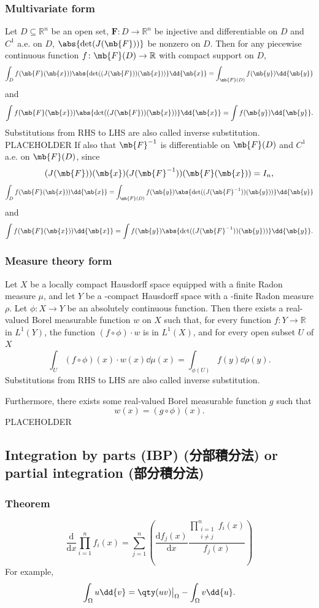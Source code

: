 \subsubsection{Multivariate form}
Let $D\subseteq\mathbb{R}^n$ be an open set, $\mathbf{F}\colon D\to\mathbb{R}^n$ be injective and differentiable on $D$ and $C^1$ a.e. on $D$, $\abs{\det(J(\mb{F}))}$ be nonzero on $D$. Then for any piecewise continuous function $f\colon\mb{F}(D)\to\mathbb{R}$ with compact support on $D$,
\[\int_Df(\mb{F}(\mb{x}))\abs{\det((J(\mb{F}))(\mb{x}))}\dd{\mb{x}}=\int_{\mb{F}(D)}f(\mb{y})\dd{\mb{y}}\]
and
\[\int f(\mb{F}(\mb{x}))\abs{\det((J(\mb{F}))(\mb{x}))}\dd{\mb{x}}=\int f(\mb{y})\dd{\mb{y}}.\]
Substitutions from RHS to LHS are also called inverse substitution.
\bpr
PLACEHOLDER
\epr
If also that $\mb{F}^{-1}$ is differentiable on $\mb{F}(D)$ and $C^1$ a.e. on $\mb{F}(D)$, since
\[(J(\mb{F}))(\mb{x})(J(\mb{F}^{-1}))(\mb{F}(\mb{x}))=I_n,\]
\[\int_Df(\mb{F}(\mb{x}))\dd{\mb{x}}=\int_{\mb{F}(D)}f(\mb{y})\abs{\det((J(\mb{F}^{-1}))(\mb{y}))}\dd{\mb{y}}\]
and
\[\int f(\mb{F}(\mb{x}))\dd{\mb{x}}=\int f(\mb{y})\abs{\det((J(\mb{F}^{-1}))(\mb{y}))}\dd{\mb{y}}.\]
\subsubsection{Measure theory form}
Let $X$ be a locally compact Hausdorff space equipped with a finite Radon measure $μ$, and let $Y$ be a \text{\textsigma}-compact Hausdorff space with a \text{\textsigma}-finite Radon measure $\rho$. Let $\phi\colon X\to Y$ be an absolutely continuous function. Then there exists a real-valued Borel measurable function $w$ on $X$ such that, for every function $f\colon Y\to\mathbb{R}$ in $L^1(Y)$, the function $(f\circ\phi)\cdot w$ is in $L^1(X)$, and for every open subset $U$ of $X$
\[\int_U(f\circ\phi)(x)\cdot w(x)\dd{\mu(x)}=\int_{\phi(U)}f(y)\dd{\rho(y)}.\]
Substitutions from RHS to LHS are also called inverse substitution.

Furthermore, there exists some real-valued Borel measurable function $g$ such that 
\[w(x)=(g\circ\phi)(x).\]
\bpr
PLACEHOLDER
\epr
\subsection{Integration by parts (IBP) (分部積分法) or partial integration (部分積分法)}
\subsubsection{Theorem}
\[\frac{\mathrm{d}}{\mathrm{d}x}\prod_{i=1}^nf_i(x)=\sum_{j=1}^n\left(\frac{\mathrm{d}f_j(x)}{\mathrm{d}x}\frac{\prod_{\substack{i=1\\i\neq j}}^n f_i(x)}{f_j(x)}\right)\]
For example,
\[\int_{\Omega} u\dd{v} = \qty(u v)\big\vert_{\Omega} - \int_{\Omega} v\dd{u}.\]

